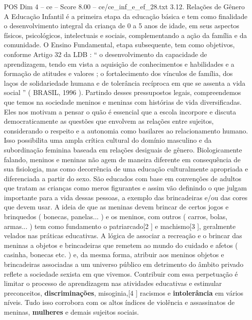 \begin{textsample}{POS Dim 4 – ce – Score 8.00 – ce/ce\_inf\_e\_ef\_28.txt}  \label{ex:f4_pos_139}
3.12.
Relações de Gênero A Educação Infantil é a primeira etapa da educação básica e tem como finalidade o desenvolvimento integral da criança de 0 a 5 anos de idade, em seus aspectos físicos, psicológicos, intelectuais e sociais, complementando a ação da família e da comunidade.
O Ensino Fundamental, etapa subsequente, tem como objetivos, conforme Artigo 32 da LDB : “ o desenvolvimento da capacidade de aprendizagem, tendo em vista a aquisição de conhecimentos e habilidades e a formação de atitudes e valores ; o fortalecimento dos vínculos de família, dos laços de solidariedade humana e de tolerância recíproca em que se assenta a vida social ” ( BRASIL, 1996 ).
Partindo desses pressupostos legais, compreendemos que temos na sociedade meninos e meninas com histórias de vida diversificadas.
Eles nos motivam a pensar o quão é essencial que a escola incorpore e discuta democraticamente as questões que envolvem as relações entre sujeitos, considerando o respeito e a autonomia como basilares ao relacionamento humano.
Isso possibilita uma ampla crítica cultural do domínio masculino e da subordinação feminina baseada em relações desiguais de gênero.
Biologicamente falando, meninos e meninas não agem de maneira diferente em consequência de sua fisiologia, mas como decorrência de uma educação culturalmente apropriada e diferenciada a partir do sexo.
São educados com base em convenções de adultos que tratam as crianças como meros figurantes e assim vão definindo o que julgam importante para a vida dessas pessoas, a exemplo das brincadeiras e/ou das cores que devem usar.
A ideia de que as meninas devem brincar de certos jogos e brinquedos ( bonecas, panelas... ) e os meninos, com outros ( carros, bolas, armas... ) tem como fundamento o patriarcado[2 ] e machismo[3 ], geralmente velados nas práticas educativas.
A lógica de associar a recreação e o brincar das meninas a objetos e brincadeiras que remetem ao mundo do cuidado e afetos ( casinha, bonecas etc. ) e, da mesma forma, atribuir aos meninos objetos e brincadeiras associadas a um universo público em detrimento do âmbito privado reflete a sociedade sexista em que vivemos.
Contribuir com essa perpetuação é limitar o processo de aprendizagem nas atividades educativas e estimular preconceitos, \textbf{discriminações}, misoginia,[4 ] racismos e \textbf{intolerância} em vários níveis.
Tudo isso corrobora com os altos índices de violência e assassinatos de meninas, \textbf{mulheres} e demais sujeitos sociais.

\end{textsample}
